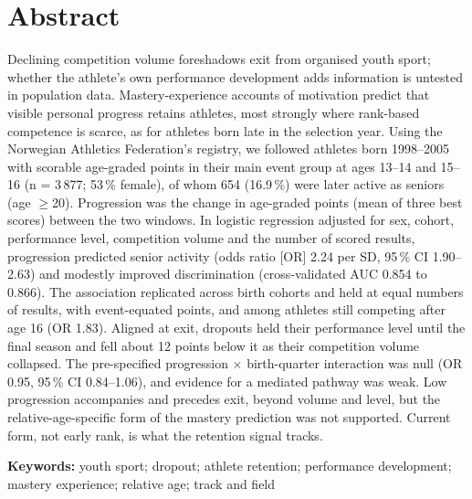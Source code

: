 \documentclass{article}
\begin{document}
\section*{Abstract}
\noindent Declining competition volume foreshadows exit from organised youth sport; whether the athlete's own performance development adds information is untested in population data. Mastery-experience accounts of motivation predict that visible personal progress retains athletes, most strongly where rank-based competence is scarce, as for athletes born late in the selection year. Using the Norwegian Athletics Federation's registry, we followed athletes born 1998--2005 with scorable age-graded points in their main event group at ages 13--14 and 15--16 (n = 3\,877; 53\,\% female), of whom 654 (16.9\,\%) were later active as seniors (age $\geq$20). Progression was the change in age-graded points (mean of three best scores) between the two windows. In logistic regression adjusted for sex, cohort, performance level, competition volume and the number of scored results, progression predicted senior activity (odds ratio [OR] 2.24 per SD, 95\,\% CI 1.90--2.63) and modestly improved discrimination (cross-validated AUC 0.854 to 0.866). The association replicated across birth cohorts and held at equal numbers of results, with event-equated points, and among athletes still competing after age 16 (OR 1.83). Aligned at exit, dropouts held their performance level until the final season and fell about 12 points below it as their competition volume collapsed. The pre-specified progression $\times$ birth-quarter interaction was null (OR 0.95, 95\,\% CI 0.84--1.06), and evidence for a mediated pathway was weak. Low progression accompanies and precedes exit, beyond volume and level, but the relative-age-specific form of the mastery prediction was not supported. Current form, not early rank, is what the retention signal tracks.

\vspace{0.5em}
\noindent\textbf{Keywords:} youth sport; dropout; athlete retention; performance development; mastery experience; relative age; track and field
\end{document}
